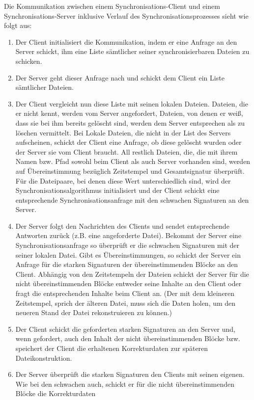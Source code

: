 Die Kommunikation zwischen einem Synchronisations-Client und einem\\ Synchronisations-Server inklusive Verlauf des Synchronisationsprozesses sieht wie folgt aus:
\begin{enumerate}
\item Der Client initialisiert die Kommunikation, indem er eine Anfrage an den Server schickt, ihm eine Liste sämtlicher seiner synchronisierbaren Dateien zu schicken.
\item Der Server geht dieser Anfrage nach und schickt dem Client ein Liste sämtlicher Dateien.
\item Der Client vergleicht nun diese Liste mit seinen lokalen Dateien. Dateien, die er nicht kennt, werden vom Server angefordert, Dateien, von denen er weiß, dass sie bei ihm
      bereits gelöscht sind, werden dem Server entsprechen als zu löschen vermittelt. Bei Lokale Dateien, die nicht in der List des Servers aufscheinen, schickt der Client
      eine Anfrage, ob diese gelöscht wurden oder der Server sie vom Client braucht.  All restlich Dateien, die, die mit ihrem Namen bzw. Pfad sowohl beim Client als auch Server 
      vorhanden sind, werden auf Übereinstimmung bezüglich Zeitstempel und Gesamtsignatur überprüft. Für die Dateipaare, bei denen diese Wert unterschiedlich sind, wird der 
      Synchronisationsalgorithmus initialisiert und der Client schickt eine entsprechende Synchronisationsanfrage mit den schwachen Signaturen an den Server.
\item Der Server folgt den Nachrichten des Clients und sendet entsprechende Antworten zurück (z.B. eine angeforderte Datei). Bekommt der Server eine Synchronisationsanfrage
      so überprüft er die schwachen Signaturen mit der seiner lokalen Datei. Gibt es Übereinstimmungen, so schickt der Server ein Anfrage für die starken Signaturen der
      übereinstimmenden Blöcke an den Client. Abhängig von den Zeitstempeln der Dateien schickt der Server für die nicht übereinstimmenden Blöcke entweder seine Inhalte
      an den Client oder fragt die entsprechenden Inhalte beim Client an. (Der mit dem kleineren Zeitstempel, sprich der älteren Datei, muss sich die Daten holen, um
      den neueren Stand der Datei rekonstruieren zu können.)
\item Der Client schickt die geforderten starken Signaturen an den Server und, wenn gefordert, auch den Inhalt der nicht übereinstimmenden Blöcke bzw. speichert der Client
      die erhaltenen Korrekturdaten zur späteren Dateikonstruktion.
\item Der Server überprüft die starken Signaturen den Clients mit seinen eigenen. Wie bei den schwachen auch, schickt er für die nicht übereinstimmenden Blöcke die Korrekturdaten

\end{enumerate}
